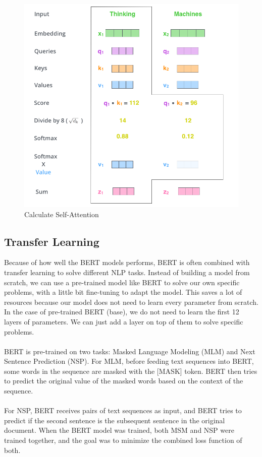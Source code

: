 \documentclass[11pt,a4paper]{article}
\begin{document}
\begin{figure}[!htbp]
	\centering
	\includegraphics[scale=0.3]{figures/self-attention.png}
	\caption{\label{fig:my-label} Calculate Self-Attention \cite{self-attention}}
\end{figure}


\subsection{Transfer Learning}

Because of how well the BERT models performs, BERT is often combined with transfer learning to solve different NLP tasks. Instead of building a model from scratch, we can use a pre-trained model like BERT to solve our own specific problems, with a little bit fine-tuning to adapt the model. This saves a lot of resources because our model does not need to learn every parameter from scratch. In the case of pre-trained BERT (base), we do not need to learn the first 12 layers of parameters. We can just add a layer on top of them to solve specific problems. \\
\\
BERT is pre-trained on two tasks: Masked Language Modeling (MLM) and Next Sentence Prediction (NSP).
For MLM, before feeding text sequences into BERT, some words in the sequence are masked with the [MASK] token. BERT then tries to predict the original value of the masked words based on the context of the sequence.\\
\\
For NSP, BERT receives pairs of text sequences as input, and BERT tries to predict if the second sentence is the subsequent sentence in the original document.
When the BERT model was trained, both MSM and NSP were trained together, and the goal was to minimize the combined loss function of both.
\end{document}
